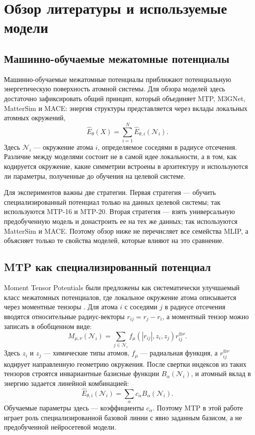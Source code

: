 \section{Обзор литературы и используемые модели}

\subsection{Машинно-обучаемые межатомные потенциалы}

Машинно-обучаемые межатомные потенциалы приближают потенциальную энергетическую поверхность атомной системы. Для обзора моделей здесь достаточно зафиксировать общий принцип, который объединяет MTP, M3GNet, MatterSim и MACE: энергия структуры представляется через вклады локальных атомных окружений,
\[
    \widehat{E}_{\theta}(X)
    =
    \sum_{i=1}^{N}\widehat{E}_{\theta,i}(\mathcal{N}_i).
\]
Здесь \(\mathcal{N}_i\) — окружение атома \(i\), определяемое соседями в радиусе отсечения. Различие между моделями состоит не в самой идее локальности, а в том, как кодируется окружение, какие симметрии встроены в архитектуру и используются ли параметры, полученные до обучения на целевой системе.

Для экспериментов важны две стратегии. Первая стратегия — обучить специализированный потенциал только на данных целевой системы; так используются MTP-16 и MTP-20. Вторая стратегия — взять универсальную предобученную модель и донастроить ее на тех же данных; так используются MatterSim и MACE. Поэтому обзор ниже не перечисляет все семейства MLIP, а объясняет только те свойства моделей, которые влияют на это сравнение.

\subsection{MTP как специализированный потенциал}

Moment Tensor Potentials были предложены как систематически улучшаемый класс межатомных потенциалов, где локальное окружение атома описывается через моментные тензоры \cite{shapeev2016mtp}. Для атома \(i\) с соседями \(j\) в радиусе отсечения вводятся относительные радиус-векторы \(r_{ij}=r_j-r_i\), а моментный тензор можно записать в обобщенном виде:
\[
    M_{\mu,\nu}(\mathcal{N}_i)
    =
    \sum_{j \in \mathcal{N}_i}
    f_{\mu}\!\left(|r_{ij}|, z_i, z_j\right)
    r_{ij}^{\otimes \nu}.
    \label{eq:mtp_moment_tensor}
\]
Здесь \(z_i\) и \(z_j\) — химические типы атомов, \(f_{\mu}\) — радиальная функция, а \(r_{ij}^{\otimes \nu}\) кодирует направленную геометрию окружения. После свертки индексов из таких тензоров строятся инвариантные базисные функции \(B_{\alpha}(\mathcal{N}_i)\), и атомный вклад в энергию задается линейной комбинацией:
\[
    \widehat{E}_{\theta,i}(\mathcal{N}_i)
    =
    \sum_{\alpha}
    c_{\alpha} B_{\alpha}(\mathcal{N}_i).
    \label{eq:mtp_atomic_energy}
\]
Обучаемые параметры здесь — коэффициенты \(c_{\alpha}\). Поэтому MTP в этой работе играет роль специализированной базовой линии с явно заданным базисом, а не предобученной нейросетевой модели.

